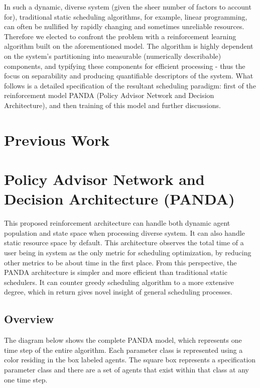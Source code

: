 \documentclass{article}
\theoremstyle{definition}
\theoremstyle{remark}
\begin{document}
	In such a dynamic, diverse system (given the sheer number of factors to account	for), traditional static scheduling algorithms, for example, linear programming, can often be nullified by rapidly changing and sometimes unreliable resources. Therefore we elected to confront the problem with a reinforcement learning algorithm built on the aforementioned model.	The algorithm is highly dependent on the system's partitioning into measurable (numerically describable) components, and typifying these components for efficient processing - thus the focus on separability and producing quantifiable descriptors of the system. What follows is a detailed specification of the resultant scheduling paradigm: first of the reinforcement model PANDA (Policy Advisor Network and Decision Architecture), and then training of this model and further discussions.
	
	\newpage
	
	\section{Previous Work}
	
	\section{Policy Advisor Network and Decision Architecture (PANDA)}
	
	This proposed reinforcement architecture can handle both dynamic agent population and state space when processing diverse system. It can also handle static resource space by default. This architecture observes the total time of a user being in system as the only metric for scheduling optimization, by reducing other metrics to be about time in the first place. From this perspective, the PANDA architecture is simpler and more efficient than traditional static schedulers. It can counter greedy scheduling algorithm to a more extensive degree, which in return gives novel insight of general scheduling processes.
		
		\subsection{Overview}
	
		The diagram below shows the complete PANDA model, which represents one time step of the entire algorithm. Each parameter class is represented using a color residing in the box labeled agents. The square box represents a specification parameter class and there are a set of agents that exist within that class at any one time step.
	
\end{document}
